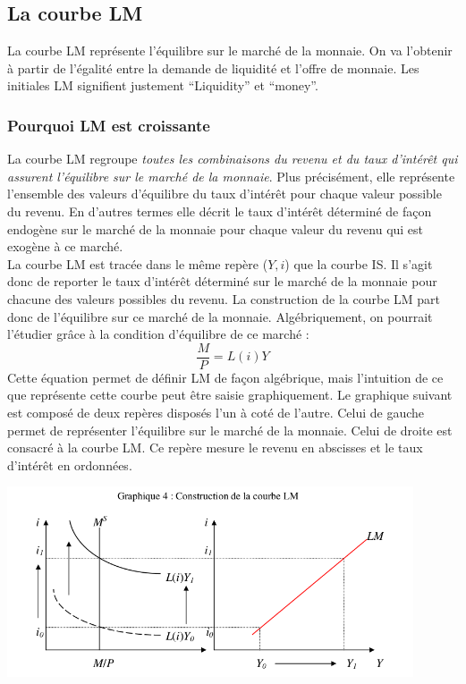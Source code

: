 \documentclass[10pt]{book}
\begin{document}
\subsection{La courbe LM}
La courbe LM représente l'équilibre sur le marché de la monnaie. On va l'obtenir à partir de l'égalité entre la demande de liquidité et l'offre de monnaie. Les initiales LM signifient justement ``Liquidity'' et ``money''. \\
\subsubsection{Pourquoi LM est croissante}
La courbe LM regroupe \textit{toutes les combinaisons du revenu et du taux d'intérêt qui assurent l'équilibre sur le marché de la monnaie}. Plus précisément, elle représente l'ensemble des valeurs d'équilibre du taux d'intérêt pour chaque valeur possible du revenu. En d'autres termes elle décrit le taux d'intérêt déterminé de façon endogène sur le marché de la monnaie pour chaque valeur du revenu qui est exogène à ce marché. \\
La courbe LM est tracée dans le même repère ($Y,i$) que la courbe IS. Il s'agit donc de reporter le taux d'intérêt déterminé sur le marché de la monnaie pour chacune des valeurs possibles du revenu. La construction de la courbe LM part donc de l'équilibre sur ce marché de la monnaie. Algébriquement, on pourrait l'étudier grâce à la condition d'équilibre de ce marché :
$$ \frac{M}{P} = L(i)Y$$
Cette équation permet de définir LM de façon algébrique, mais l'intuition de ce que représente cette courbe peut être saisie graphiquement. Le graphique suivant est composé de deux repères disposés l'un à coté de l'autre. Celui de gauche permet de représenter l'équilibre sur le marché de la monnaie. Celui de droite est consacré à la courbe LM. Ce repère mesure le revenu en abscisses et le taux d'intérêt en ordonnées.
\begin{center}
  \includegraphics[width=12cm]{graph26.png}
\end{center}
\end{document}

